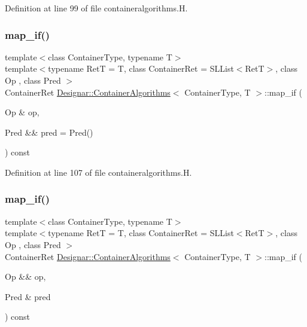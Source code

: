 Definition at line 99 of file containeralgorithms.\+H.

\mbox{\label{class_designar_1_1_container_algorithms_a06b2fbf8f85675b8c69be00399710031}} 
\subsubsection{\texorpdfstring{map\+\_\+if()}{map\_if()}\hspace{0.1cm}{\footnotesize\ttfamily [2/4]}}
{\footnotesize\ttfamily template$<$class Container\+Type, typename T$>$ \\
template$<$typename RetT  = T, class Container\+Ret  = S\+L\+List$<$\+Ret\+T$>$, class Op , class Pred $>$ \\
Container\+Ret \hyperlink{class_designar_1_1_container_algorithms}{Designar\+::\+Container\+Algorithms}$<$ Container\+Type, T $>$\+::map\+\_\+if (\begin{DoxyParamCaption}\item[{Op \&}]{op,  }\item[{Pred \&\&}]{pred = {\ttfamily Pred()} }\end{DoxyParamCaption}) const\hspace{0.3cm}{\ttfamily [inline]}}



Definition at line 107 of file containeralgorithms.\+H.

\mbox{\label{class_designar_1_1_container_algorithms_a582b067d39658825339075873f20aee6}} 
\subsubsection{\texorpdfstring{map\+\_\+if()}{map\_if()}\hspace{0.1cm}{\footnotesize\ttfamily [3/4]}}
{\footnotesize\ttfamily template$<$class Container\+Type, typename T$>$ \\
template$<$typename RetT  = T, class Container\+Ret  = S\+L\+List$<$\+Ret\+T$>$, class Op , class Pred $>$ \\
Container\+Ret \hyperlink{class_designar_1_1_container_algorithms}{Designar\+::\+Container\+Algorithms}$<$ Container\+Type, T $>$\+::map\+\_\+if (\begin{DoxyParamCaption}\item[{Op \&\&}]{op,  }\item[{Pred \&}]{pred }\end{DoxyParamCaption}) const\hspace{0.3cm}{\ttfamily [inline]}}



